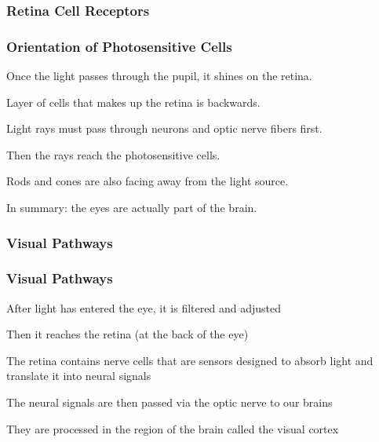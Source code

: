 \documentclass[12pt]{beamer}\usepackage[]{graphicx}\usepackage[]{color}
\begin{document}

\begin{frame}
\frametitle{Retina Cell Receptors}
\begin{center}
\end{center}
\end{frame}


\begin{frame}
\frametitle{Orientation of Photosensitive Cells}

\bbi
  \item Once the light passes through the pupil, it shines on the retina.
  \item Layer of cells that makes up the retina is backwards.
  \item Light rays must pass through neurons and optic nerve fibers first.
  \item Then the rays reach the photosensitive cells.
  \item Rods and cones are also facing away from the light source.
  \item In summary: the eyes are actually part of the brain.
\ei

\end{frame}



\begin{frame}
\begin{center}
\Huge{}
\end{center}
\end{frame}


\begin{frame}
\frametitle{Visual Pathways}
\begin{center}
\end{center}
\end{frame}


\begin{frame}
\frametitle{Visual Pathways}

\bbi
  \item After light has entered the eye, it is filtered and adjusted
  \item Then it reaches the retina (at the back of the eye)
  \item The retina contains nerve cells that are sensors designed to absorb
  light and translate it into neural signals
  \item The neural signals are then passed via the optic nerve to our brains
  \item They are processed in the region of the brain called the visual cortex
\ei

\end{frame}
\end{document}
